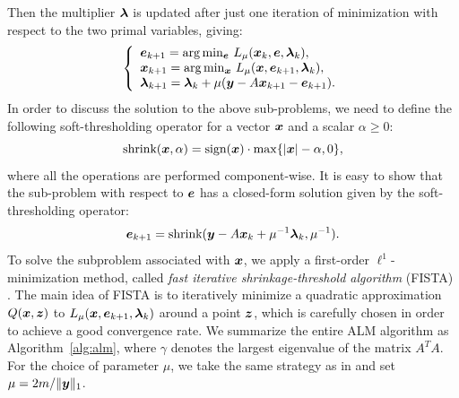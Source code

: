 \documentclass[12pt,journal,draftcls,letterpaper,onecolumn]{IEEEtran}
\providecommand{\DIFaddend}{} %
\providecommand{\DIFdelbegin}{} %
\begin{document}
\DIFaddend Then the multiplier $\boldsymbol{\lambda}$ is updated after just one iteration of minimization
with respect to the two primal variables, giving:
\begin{equation}
\left \{
\begin{array}{lll}
\e_{k+1}  =  \arg\min_{\e} \, L_{\mu} (\x_k,\e,\blamda_k),\\
\x_{k+1}  =  \arg\min_{\x} \, L_{\mu} (\x,\e_{k+1},\blamda_k),\\
\blamda_{k+1}  =  \blamda_k + \mu (\y - A\x_{k+1} - \e_{k+1}). \\
\end{array}
\right .
\label{eq:adm}
\end{equation}
In order to discuss the solution to the above sub-problems, we
need to define the following soft-thresholding operator for a
vector ${\boldsymbol{x}}$ and a scalar $\alpha \geq 0$:
\begin{equation}
\textup{shrink}({\boldsymbol{x}},\alpha) = \textup{sign}({\boldsymbol{x}})\cdot \max \{|{\boldsymbol{x}}| - \alpha, 0\},
\end{equation}
where all the operations are performed component-wise. It is
easy to show that the sub-problem with respect to $\boldsymbol{e}$ has a
closed-form solution given by the soft-thresholding operator:
\begin{equation}
\boldsymbol{e}_{k+1} = \textup{shrink}({\boldsymbol{y}} - A{\boldsymbol{x}}_k + \mu^{-1}\boldsymbol{\lambda}_k, \mu^{-1}).
\end{equation}
To solve the subproblem associated with ${\boldsymbol{x}}$, we
apply a first-order $\ell^1$-minimization method,
called \emph{fast iterative shrinkage-threshold algorithm}
(FISTA) \cite{BeckA2009}. The main idea of FISTA is to
iteratively minimize a quadratic approximation $Q({\boldsymbol{x}}, \boldsymbol{z})$ to
$L_{\mu} ({\boldsymbol{x}},\boldsymbol{e}_{k+1},\boldsymbol{\lambda}_k)$ around a point $\boldsymbol{z}$, which is
carefully chosen in order to achieve a good convergence
rate. We summarize the entire ALM
algorithm as Algorithm~\ref{alg:alm}, where $\gamma$ denotes the
largest eigenvalue of the matrix $A^TA$. For the choice of parameter $\mu$, we take the same strategy as
in \cite{YangJ2009-pp} and set $\mu = 2m / \|{\boldsymbol{y}}\|_1$.
\DIFdelbegin %
\end{document}
